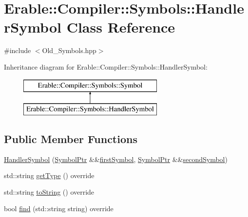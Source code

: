 \hypertarget{class_erable_1_1_compiler_1_1_symbols_1_1_handler_symbol}{}\section{Erable\+::Compiler\+::Symbols\+::Handler\+Symbol Class Reference}
\label{class_erable_1_1_compiler_1_1_symbols_1_1_handler_symbol}


{\ttfamily \#include $<$Old\+\_\+\+Symbols.\+hpp$>$}

Inheritance diagram for Erable\+::Compiler\+::Symbols\+::Handler\+Symbol\+:\begin{figure}[H]
\begin{center}
\leavevmode
\includegraphics[height=2.000000cm]{class_erable_1_1_compiler_1_1_symbols_1_1_handler_symbol}
\end{center}
\end{figure}
\subsection*{Public Member Functions}
\begin{DoxyCompactItemize}
\item 
\mbox{\hyperlink{class_erable_1_1_compiler_1_1_symbols_1_1_handler_symbol_aa9c04c81afc5b63e1d21870246ead444}{Handler\+Symbol}} (\mbox{\hyperlink{namespace_erable_1_1_compiler_1_1_symbols_a8f0bc762f448ea4d84e8713ab3e140b9}{Symbol\+Ptr}} \&\&\mbox{\hyperlink{class_erable_1_1_compiler_1_1_symbols_1_1_handler_symbol_a9dbe5735944a60d37a358f6575c65d71}{first\+Symbol}}, \mbox{\hyperlink{namespace_erable_1_1_compiler_1_1_symbols_a8f0bc762f448ea4d84e8713ab3e140b9}{Symbol\+Ptr}} \&\&\mbox{\hyperlink{class_erable_1_1_compiler_1_1_symbols_1_1_handler_symbol_af2b4f052f351332800d5c06b70331c0a}{second\+Symbol}})
\item 
std\+::string \mbox{\hyperlink{class_erable_1_1_compiler_1_1_symbols_1_1_handler_symbol_a70340ea487e496cced8c05aa45968b56}{get\+Type}} () override
\item 
std\+::string \mbox{\hyperlink{class_erable_1_1_compiler_1_1_symbols_1_1_handler_symbol_ae0846995b3c622180725b160a1e17f8a}{to\+String}} () override
\item 
bool \mbox{\hyperlink{class_erable_1_1_compiler_1_1_symbols_1_1_handler_symbol_a04f772599f70bfad40ccb8b4facd6cb0}{find}} (std\+::string string) override
\end{DoxyCompactItemize}
